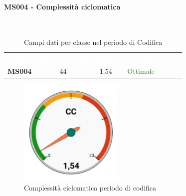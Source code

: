 \paragraph{MS004 - Complessità ciclomatica}\mbox{}\\[0,3cm]
    \begin{table}[H]
        \centering
        \begin{tabular}{ccccccc}
            \rowcolor{greySWEight}
            \textcolor{white}{\textbf{Codice}} &
            \textcolor{white}{\textbf{File analizzati}} &
            \textcolor{white}{\textbf{Valore}}&
            \textcolor{white}{\textbf{Riscontro}}\\
            \textbf{MS004} & 44 & 1.54 & \textcolor{ForestGreen}{Ottimale}\\
        \end{tabular}
        \caption{Campi dati per classe nel periodo di Codifica}
    \end{table}
    \begin{figure}[H]
        \centering
        \includegraphics[width=50mm]{sez/App_Esito/Qualifica/graph/complCCruscotto.pdf}
        \caption{Complessità ciclomatica periodo di codifica}
    \end{figure}

